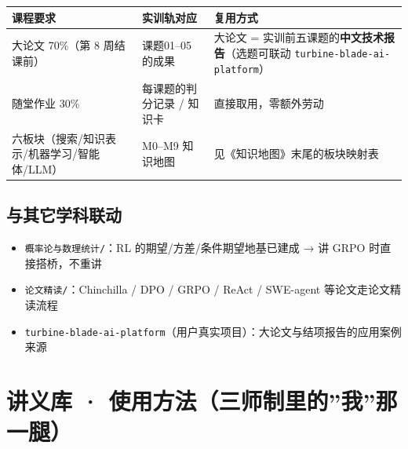 \documentclass[
  chinese,
  11pt,
]{ctexart}
\newcounter{none} %
\providecommand{\tightlist}{%
  \setlength{\itemsep}{0pt}\setlength{\parskip}{0pt}}
\begin{document}
{\def\LTcaptype{none} %
\begin{longtable}[]{@{}
  >{\raggedright\arraybackslash}p{}
  >{\raggedright\arraybackslash}p{}
  >{\raggedright\arraybackslash}p{}@{}}
\toprule\noalign{}
\begin{minipage}[b]{\linewidth}\raggedright
课程要求
\end{minipage} & \begin{minipage}[b]{\linewidth}\raggedright
实训轨对应
\end{minipage} & \begin{minipage}[b]{\linewidth}\raggedright
复用方式
\end{minipage} \\
\midrule\noalign{}
\endhead
\bottomrule\noalign{}
\endlastfoot
大论文 70\%（第 8 周结课前） & 课题01--05 的成果 & 大论文 = 实训前五课题的\textbf{中文技术报告}（选题可联动 \texttt{turbine-blade-ai-platform}） \\
随堂作业 30\% & 每课题的判分记录 / 知识卡 & 直接取用，零额外劳动 \\
六板块（搜索/知识表示/机器学习/智能体/LLM） & M0--M9 知识地图 & 见《知识地图》末尾的板块映射表 \\
\end{longtable}
}

\subsection{与其它学科联动}\label{ux4e0eux5176ux5b83ux5b66ux79d1ux8054ux52a8}

\begin{itemize}
\tightlist
\item
  \texttt{概率论与数理统计/}：RL 的期望/方差/条件期望地基已建成 → 讲 GRPO 时直接搭桥，不重讲
\item
  \texttt{论文精读/}：Chinchilla / DPO / GRPO / ReAct / SWE-agent 等论文走论文精读流程
\item
  \texttt{turbine-blade-ai-platform}（用户真实项目）：大论文与结项报告的应用案例来源
\end{itemize}

\newpage

\section{讲义库 · 使用方法（三师制里的''我''那一腿）}\label{ux8bb2ux4e49ux5e93-ux4f7fux7528ux65b9ux6cd5ux4e09ux5e08ux5236ux91ccux7684ux6211ux90a3ux4e00ux817f}
\end{document}
